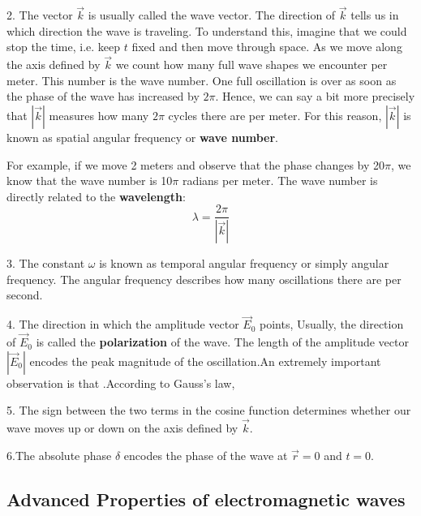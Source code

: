 2. The vector $\vec{k}$ is usually called the wave vector. The direction of $\vec{k}$ tells us in which direction the wave is traveling. \textbf{} To understand this, imagine that we could stop the time, i.e. keep $t$ fixed and then move through space. As we move along the axis defined by $\vec{k}$ we count how many full wave shapes we encounter per meter. This number is the wave number. One full oscillation is over as soon as the phase of the wave has increased by $2\pi$. Hence, we can say a bit more precisely that $|\vec{k}|$ measures how many $2\pi$ cycles there are per meter. For this reason, $|\vec{k}|$ is known as spatial angular frequency or \textbf{wave number}.

For example, if we move 2 meters and observe that the phase changes by 20$\pi$, we know that the wave number is 10$\pi$ radians per meter. The wave number is directly related to the \textbf{wavelength}:
\begin{equation}
\lambda=\frac{2 \pi}{|\vec{k}|}
\end{equation}

3. The constant $\omega$ is known as temporal angular frequency or simply angular frequency. The angular frequency describes how many oscillations there are per second. 

4. The direction in which the amplitude vector $\vec{E}_{0}$ points,  Usually, the direction of $\vec{E}_{0}$ is called the \textbf{polarization} of the wave. The length of the amplitude vector $\left|\vec{E}_{0}\right|$ encodes the peak magnitude of the oscillation.An extremely important observation is that .According to Gauss's law, 

5. The sign between the two terms in the cosine function determines whether our wave moves up or down on the axis defined by $\vec{k}$.

6.The absolute phase $\delta$ encodes the phase of the wave at $\vec{r}=0$ and $t=0$.

\subsection{Advanced Properties of electromagnetic waves}
